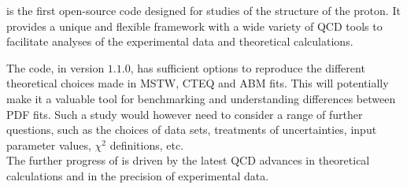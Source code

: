 
\label{sec:summary}
\fitter is the first open-source code designed for studies of the structure of the proton.
It provides a unique and flexible framework with a wide variety of QCD tools to 
facilitate analyses of the experimental data and theoretical calculations. 

The \fitter code, in version $1.1.0$, has sufficient options to reproduce the different 
theoretical choices made in MSTW, CTEQ and ABM fits. This will potentially make it a  
valuable tool for benchmarking and understanding differences between PDF fits. 
Such a study would however need to consider a range of further questions, such as the choices of
data sets, treatments of uncertainties, input parameter values, $\chi^2$ definitions, etc. 
\\
The further progress of \fitter is driven by the latest QCD advances in theoretical calculations 
and in the precision of experimental data.




